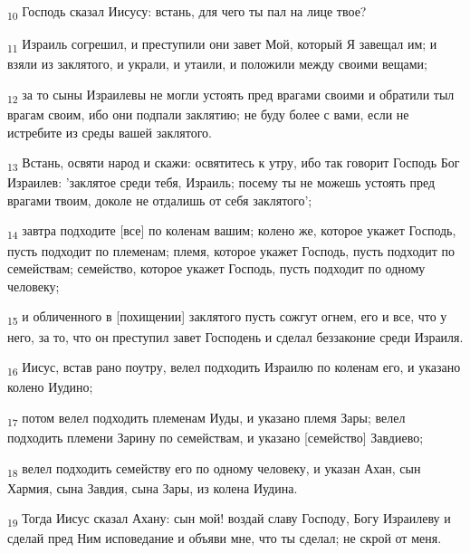 \begin{tcolorbox}
\textsubscript{10} Господь сказал Иисусу: встань, для чего ты пал на лице твое?
\end{tcolorbox}
\begin{tcolorbox}
\textsubscript{11} Израиль согрешил, и преступили они завет Мой, который Я завещал им; и взяли из заклятого, и украли, и утаили, и положили между своими вещами;
\end{tcolorbox}
\begin{tcolorbox}
\textsubscript{12} за то сыны Израилевы не могли устоять пред врагами своими и обратили тыл врагам своим, ибо они подпали заклятию; не буду более с вами, если не истребите из среды вашей заклятого.
\end{tcolorbox}
\begin{tcolorbox}
\textsubscript{13} Встань, освяти народ и скажи: освятитесь к утру, ибо так говорит Господь Бог Израилев: 'заклятое среди тебя, Израиль; посему ты не можешь устоять пред врагами твоим, доколе не отдалишь от себя заклятого';
\end{tcolorbox}
\begin{tcolorbox}
\textsubscript{14} завтра подходите [все] по коленам вашим; колено же, которое укажет Господь, пусть подходит по племенам; племя, которое укажет Господь, пусть подходит по семействам; семейство, которое укажет Господь, пусть подходит по одному человеку;
\end{tcolorbox}
\begin{tcolorbox}
\textsubscript{15} и обличенного в [похищении] заклятого пусть сожгут огнем, его и все, что у него, за то, что он преступил завет Господень и сделал беззаконие среди Израиля.
\end{tcolorbox}
\begin{tcolorbox}
\textsubscript{16} Иисус, встав рано поутру, велел подходить Израилю по коленам его, и указано колено Иудино;
\end{tcolorbox}
\begin{tcolorbox}
\textsubscript{17} потом велел подходить племенам Иуды, и указано племя Зары; велел подходить племени Зарину по семействам, и указано [семейство] Завдиево;
\end{tcolorbox}
\begin{tcolorbox}
\textsubscript{18} велел подходить семейству его по одному человеку, и указан Ахан, сын Хармия, сына Завдия, сына Зары, из колена Иудина.
\end{tcolorbox}
\begin{tcolorbox}
\textsubscript{19} Тогда Иисус сказал Ахану: сын мой! воздай славу Господу, Богу Израилеву и сделай пред Ним исповедание и объяви мне, что ты сделал; не скрой от меня.
\end{tcolorbox}
